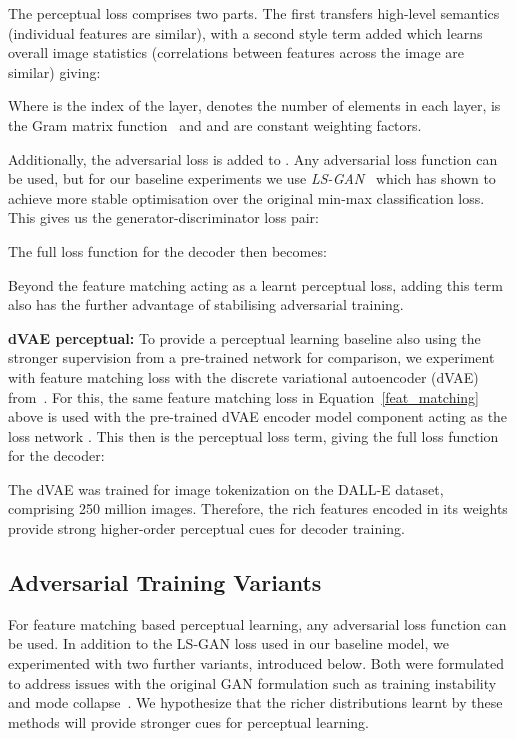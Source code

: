 \documentclass[10pt,twocolumn,letterpaper, cta-author]{article}
\begin{document}
The perceptual loss comprises two parts. The first transfers high-level semantics (individual features are similar), with a second style term added which learns overall image statistics (correlations between features across the image are similar) giving:





Where  is the index of the layer,  denotes the number of elements in each layer,  is the Gram matrix function~\cite{7780634} and  and  are constant weighting factors.

Additionally, the adversarial loss is added to . Any adversarial loss function can be used, but for our baseline experiments we use \textit{LS-GAN}~\cite{Mao2017LeastSG} which has shown to achieve more stable optimisation over the original min-max classification loss. This gives us the generator-discriminator loss pair:




The full loss function for the decoder then becomes:



Beyond the feature matching acting as a learnt perceptual loss, adding this term also has the further advantage of stabilising adversarial training.

\textbf{dVAE perceptual:} To provide a perceptual learning baseline also using the stronger supervision from a pre-trained network for comparison, we experiment with feature matching loss with the discrete variational autoencoder (dVAE) from~\cite{pmlr-v139-ramesh21a}. For this, the same feature matching loss in Equation~\ref{feat_matching} above is used with the pre-trained dVAE encoder model component acting as the loss network . This then is the perceptual loss term, giving the full loss function for the decoder:



The dVAE was trained for image tokenization on the DALL-E dataset, comprising 250 million images. Therefore, the rich features encoded in its weights provide strong higher-order perceptual cues for decoder training.


\subsection{Adversarial Training Variants}
\label{adversarial_losses}
For feature matching based perceptual learning, any adversarial loss function can be used. In addition to the LS-GAN loss used in our baseline model, we experimented with two further variants, introduced below. Both were formulated to address issues with the original GAN formulation such as training instability and mode collapse~\cite{karnewar2019msg}. We hypothesize that the richer distributions learnt by these methods will provide stronger cues for perceptual learning.
\end{document}
